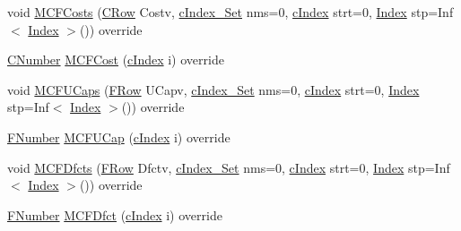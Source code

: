 \begin{DoxyCompactItemize}
\item 
void \mbox{\hyperlink{class_s_p_tree_a2fed5c60a9bf5b3988eed33d46d0c6de}{M\+C\+F\+Costs}} (\mbox{\hyperlink{class_m_c_f_class_a62409402be4e4b301e1a568f99f877be}{C\+Row}} Costv, \mbox{\hyperlink{class_m_c_f_class_a81575b2d4e4d5636b17170432150ae69}{c\+Index\+\_\+\+Set}} nms=0, \mbox{\hyperlink{class_m_c_f_class_a76aaabb20535c51a2752b93f6c38fe54}{c\+Index}} strt=0, \mbox{\hyperlink{class_m_c_f_class_ad53d6229d7ec28555a9c9c2fd9abf773}{Index}} stp=Inf$<$ \mbox{\hyperlink{class_m_c_f_class_ad53d6229d7ec28555a9c9c2fd9abf773}{Index}} $>$()) override
\item 
\mbox{\hyperlink{class_m_c_f_class_a24d0627ba8213afe1ec4ebeb4508e8f1}{C\+Number}} \mbox{\hyperlink{class_s_p_tree_ae8d376071c83375949461c34d5186b40}{M\+C\+F\+Cost}} (\mbox{\hyperlink{class_m_c_f_class_a76aaabb20535c51a2752b93f6c38fe54}{c\+Index}} i) override
\item 
void \mbox{\hyperlink{class_s_p_tree_a742113904705a8a2be411ff4939226ae}{M\+C\+F\+U\+Caps}} (\mbox{\hyperlink{class_m_c_f_class_a9dae1f1a39c208ce3c2b337cd5bb3d00}{F\+Row}} U\+Capv, \mbox{\hyperlink{class_m_c_f_class_a81575b2d4e4d5636b17170432150ae69}{c\+Index\+\_\+\+Set}} nms=0, \mbox{\hyperlink{class_m_c_f_class_a76aaabb20535c51a2752b93f6c38fe54}{c\+Index}} strt=0, \mbox{\hyperlink{class_m_c_f_class_ad53d6229d7ec28555a9c9c2fd9abf773}{Index}} stp=Inf$<$ \mbox{\hyperlink{class_m_c_f_class_ad53d6229d7ec28555a9c9c2fd9abf773}{Index}} $>$()) override
\item 
\mbox{\hyperlink{class_m_c_f_class_aeea3e5951d222b2a8e57de1b4246a909}{F\+Number}} \mbox{\hyperlink{class_s_p_tree_a1dc1ae53fb2a2984318a9b4e62702ec6}{M\+C\+F\+U\+Cap}} (\mbox{\hyperlink{class_m_c_f_class_a76aaabb20535c51a2752b93f6c38fe54}{c\+Index}} i) override
\item 
void \mbox{\hyperlink{class_s_p_tree_a5931fae93a24401ed943ec1f5c0cb18f}{M\+C\+F\+Dfcts}} (\mbox{\hyperlink{class_m_c_f_class_a9dae1f1a39c208ce3c2b337cd5bb3d00}{F\+Row}} Dfctv, \mbox{\hyperlink{class_m_c_f_class_a81575b2d4e4d5636b17170432150ae69}{c\+Index\+\_\+\+Set}} nms=0, \mbox{\hyperlink{class_m_c_f_class_a76aaabb20535c51a2752b93f6c38fe54}{c\+Index}} strt=0, \mbox{\hyperlink{class_m_c_f_class_ad53d6229d7ec28555a9c9c2fd9abf773}{Index}} stp=Inf$<$ \mbox{\hyperlink{class_m_c_f_class_ad53d6229d7ec28555a9c9c2fd9abf773}{Index}} $>$()) override
\item 
\mbox{\hyperlink{class_m_c_f_class_aeea3e5951d222b2a8e57de1b4246a909}{F\+Number}} \mbox{\hyperlink{class_s_p_tree_a160bbf78d4101054d9390b7e1a838eea}{M\+C\+F\+Dfct}} (\mbox{\hyperlink{class_m_c_f_class_a76aaabb20535c51a2752b93f6c38fe54}{c\+Index}} i) override

\end{DoxyCompactItemize}
